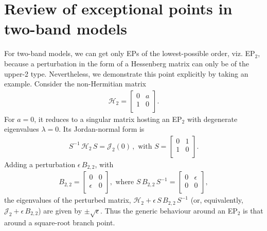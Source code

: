 \documentclass[aps, prb, onecolumn, nofootinbib, citeautoscript, 10pt]{revtex4-2}
\begin{document}
\section{Review of exceptional points in two-band models}
\label{secep2}

For two-band models, we can get only EPs of the lowest-possible order, viz. EP$_2$, because a perturbation in the form of a Hessenberg matrix can only be of the upper-2 type. Nevertheless, we demonstrate this point explicitly by taking an example. Consider the non-Hermitian matrix
\begin{align}
\mathcal H_2 = \begin{bmatrix}
0 & a\\
1 & 0 \\
\end{bmatrix}.
\end{align}
For $a=0$, it reduces to a singular matrix hosting an EP$_2$ with degenerate eigenvalues $\lambda = 0 $. Its Jordan-normal form is
\begin{align}
S^{-1} \, \mathcal H_2  \, S = \mathcal J_2 (0)\,, \text{ with }
S = \begin{bmatrix}
0 & 1\\
1 & 0 \\
\end{bmatrix}.
\end{align}
Adding a perturbation $\epsilon \, B_{2,2}$, with
\begin{align}
B_{2,2} = \begin{bmatrix}
0 & 0\\
\epsilon  & 0 \\
\end{bmatrix}, \text{ where }
S\, B_{2,2}\, S^{-1} = \begin{bmatrix}
0 & \epsilon \\
0  & 0 \\
\end{bmatrix},
\end{align}
the eigenvalues of the perturbed matrix, $\mathcal H_2 + \epsilon\,  S\, B_{2,2}\, S^{-1}$ (or, equivalently, $\mathcal J_2 + \epsilon\, B_{2,2} $) are given by $ \pm \sqrt \epsilon$. Thus the generic behaviour around an EP$_2$ is that around a square-root branch point.



\end{document}
